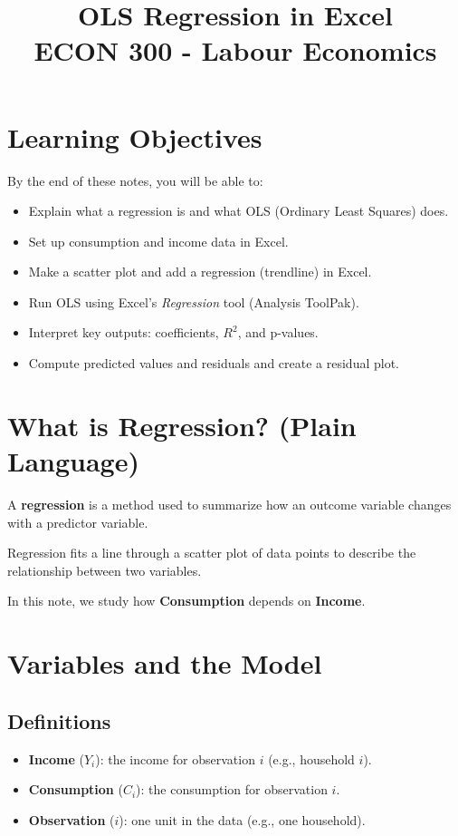 \documentclass[11pt]{article}
\title{\textbf{OLS Regression in Excel}\\[0.9em]
\large ECON 300 - Labour Economics}
\author{}
\date{}
\begin{document}
\maketitle

\section*{Learning Objectives}
By the end of these notes, you will be able to:
\begin{itemize}
  \item Explain what a regression is and what OLS (Ordinary Least Squares) does.
  \item Set up consumption and income data in Excel.
  \item Make a scatter plot and add a regression (trendline) in Excel.
  \item Run OLS using Excel's \emph{Regression} tool (Analysis ToolPak).
  \item Interpret key outputs: coefficients, $R^2$, and p-values.
  \item Compute predicted values and residuals and create a residual plot.
\end{itemize}

\section*{What is Regression? (Plain Language)}
A \textbf{regression} is a method used to summarize how an outcome variable changes with a predictor variable.

\begin{tcolorbox}[colback=gray!5, colframe=black!40, title=Key Idea]
Regression fits a line through a scatter plot of data points to describe the relationship between two variables.
\end{tcolorbox}

In this note, we study how \textbf{Consumption} depends on \textbf{Income}.

\section*{Variables and the Model}
\subsection*{Definitions}
\begin{itemize}
  \item \textbf{Income} ($Y_i$): the income for observation $i$ (e.g., household $i$).
  \item \textbf{Consumption} ($C_i$): the consumption for observation $i$.
  \item \textbf{Observation} ($i$): one unit in the data (e.g., one household).
\end{itemize}
\end{document}
